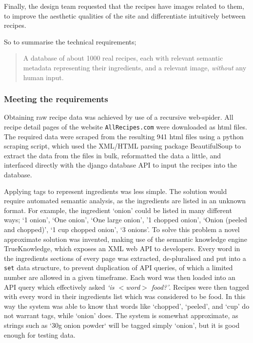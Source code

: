 Finally, the design team requested that the recipes have images related to them, to improve the aesthetic qualities of the site and differentiate intuitively between recipes.

So to summarise the technical requirements;

\begin{quotation}
A database of about 1000 real recipes, each with relevant semantic metadata representing their ingredients, and a relevant image, \textit{without} any human input.
\end{quotation}

\subsubsection{Meeting the requirements}

Obtaining raw recipe data was achieved by use of a recursive web-spider. All recipe detail pages of the website \texttt{AllRecipes.com} were downloaded as html files. The required data were scraped from the resulting 941 html files using a python scraping script, which used the XML/HTML parsing package BeautifulSoup to extract the data from the files in bulk, reformatted the data a little, and interfaced directly with the django database API to input the recipes into the database.

Applying tags to represent ingredients was less simple. The solution would require automated semantic analysis, as the ingredients are listed in an unknown format. For example, the ingredient `onion' could be listed in many different ways; `1 onion', `One onion', `One large onion', '1 chopped onion', `Onion (peeled and chopped)', `1 cup chopped onion', `3 onions'. To solve this problem a novel approximate solution was invented, making use of the semantic knowledge engine TrueKnowledge, which exposes an XML web API to developers. Every word in the ingredients sections of every page was extracted, de-pluralised and put into a \texttt{set} data structure, to prevent duplication of API queries, of which a limited number are allowed in a given timeframe. Each word was then loaded into an API query which effectively asked \textit{`is $<$word$>$ food?'}. Recipes were then tagged with every word in their ingredients list which was considered to be food. In this way the system was able to know that words like `chopped', `peeled', and `cup' do not warrant tags, while `onion' does. The system is somewhat approximate, as strings such as `30g onion powder` will be tagged simply `onion', but it is good enough for testing data.

